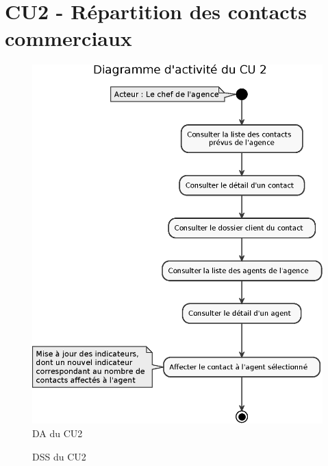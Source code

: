 \section{CU2 - Répartition des contacts commerciaux}
\vspace{2cm}
\begin{figure}[H]
\centering
\includegraphics[width=\textwidth]{figures/eps/DA_CU2.eps}
\caption{DA du CU2}
\end{figure}


\begin{figure}[H]
\noindent{}
\caption{DSS du CU2}
\end{figure}



